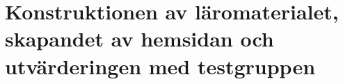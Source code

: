 



\chapter{Konstruktionen av läromaterialet, skapandet av hemsidan och utvärderingen med testgruppen}

